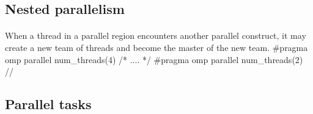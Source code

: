 \documentclass[%
oneside,                 %
final,                   %
10pt]{article}
\begin{document}
\noindent




\subsection{Nested parallelism}

\paragraph{}
When a thread in a parallel region encounters another parallel construct, it
may create a new team of threads and become the master of the new
team.
\bcppcod
#pragma omp parallel num_threads(4)
{
/* .... */
#pragma omp parallel num_threads(2)
{
//  
}
}
\ecppcod




\subsection{Parallel tasks}

\end{document}
